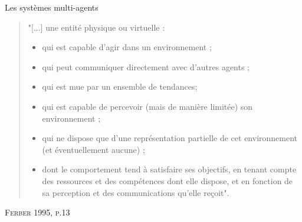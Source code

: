 \documentclass[newPxFont]{beamer}
\begin{document}
\begin{frame}[c]{Les systèmes multi-agents}
  \vspace{-2em}
  \small
  \begin{quote}
    "[...] une entité physique ou virtuelle :
      \begin{itemize}
        \item qui est capable d'agir dans un environnement ;
        \item qui peut communiquer directement avec d'autres agents ;
        \item qui est mue par un ensemble de tendances;
        \item qui est capable de percevoir (mais de manière limitée) son environnement ;
        \item qui ne dispose que d'une représentation partielle de cet environnement (et éventuellement aucune) ;
        \item dont le comportement tend à satisfaire ses objectifs, en tenant compte des ressources et des compétences dont elle dispose, et en fonction de sa perception et des communications qu'elle reçoit".
      \end{itemize}
  \end{quote}
  \hspace*{\fill}\textsc{Ferber 1995, p.13}
\end{frame}

\end{document}
